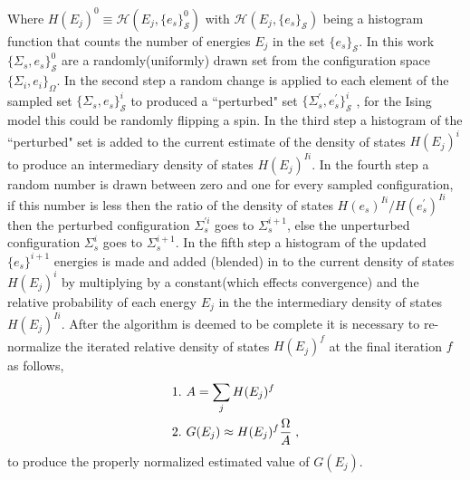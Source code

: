 \documentclass[twocolumn]{article}
\begin{document}
Where  $H(E_j)^0 \equiv \mathcal{H}(E_j,\{e_s\}_{\mathcal{S}}^0)$ with $\mathcal{H}(E_j,\{e_s\}_{\mathcal{S}})$ being a histogram function that counts the number of energies $E_j$ in the set $\{e_s\}_{\mathcal{S}}$. In this work $\{\Sigma_{s},e_s\}_{\mathcal{S}}^0$  are a randomly(uniformly) drawn set from the configuration space $\{ \Sigma_i, e_i \}_\Omega $. In the second step  a random change is applied to each element of the sampled set $\{\Sigma_{s},e_s\}_{\mathcal{S}}^i$ to produced a ``perturbed" set $ \{\Sigma_{s}^{'},e_s^{'}\}_{\mathcal{S}}^i$ , for the Ising model this could be randomly flipping a spin. In the third step a histogram of the ``perturbed" set is added to the current estimate of the density of states $H(E_j)^i$ to produce an intermediary density of states $H(E_j)^{Ii}$. In the fourth step a random number is drawn between zero and one for every sampled configuration, if this number is less then the ratio of the density of states $H(e_s)^{Ii}/H(e_s^{'})^{Ii}$ then the perturbed configuration $\Sigma_{s}^{'i}$ goes to $\Sigma_{s}^{i+1}$,  else the unperturbed configuration $\Sigma_{s}^{i}$ goes to $\Sigma_{s}^{i+1}$. In the fifth step a histogram of the updated $\{ e_s \}^{i+1}$ energies is made and added (blended) in to the current density of states $H(E_j)^i$   by multiplying  by a constant(which effects convergence) and the relative probability of each energy $E_j$ in the the intermediary density of states $H(E_j)^{Ii}$. After the algorithm is deemed to be complete it is necessary to re-normalize the iterated relative density of states $H(E_j)^f$ at the final iteration $f$ as follows, 
\begin{equation}
\begin{split}
&1. \hspace{0.125cm} A = \sum_jH(E_j)^f\\
&2. \hspace{0.125cm} G(E_j)\approx H(E_j)^f \frac{\Omega}{A} \;,
\end{split}
\end{equation}
to produce the properly normalized estimated value of $G(E_j)$. 
\end{document}
